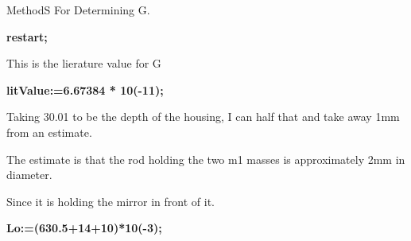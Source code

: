 \documentclass{article}
\begin{document}
\pagestyle{empty}
\begin{maplegroup}
\begin{Maple Normal}{
MethodS For Determining G.}\end{Maple Normal}
\textbf{restart;}\textbf{}\end{maplegroup}
\begin{maplegroup}
\begin{Maple Normal}{
}\end{Maple Normal}
\end{maplegroup}
\begin{maplegroup}
\begin{Maple Normal}{
This is the lierature value for G}\end{Maple Normal}

\textbf{litValue:=6.67384 * 10(-11);}\mapleresult
\begin{maplelatex}
\end{maplelatex}
\end{maplegroup}
\begin{maplegroup}
\begin{Maple Normal}{
}\end{Maple Normal}
\begin{Maple Normal}{
Taking 30.01 to be the depth of the housing, I can half that and take away 1mm from an estimate.}\end{Maple Normal}

\begin{Maple Normal}{
The estimate is that the rod holding the two m1 masses is approximately 2mm in diameter.}\end{Maple Normal}

\begin{Maple Normal}{
Since it is holding the mirror in front of it.}\end{Maple Normal}

\begin{Maple Normal}{
}\end{Maple Normal}
\textbf{Lo:=(630.5+14+10)*10(-3);}\mapleresult
\begin{maplelatex}
\end{maplelatex}
\end{maplegroup}
\end{document}
